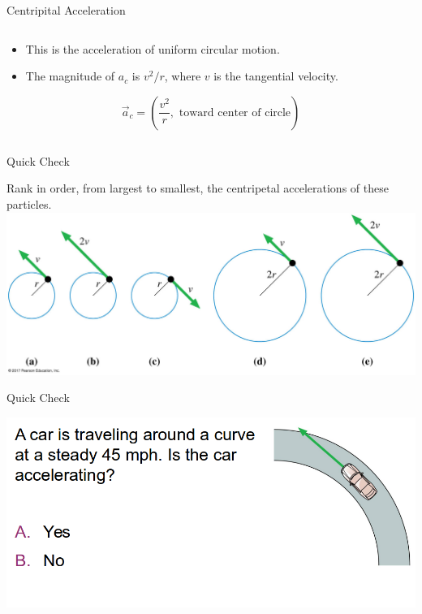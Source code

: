 \documentclass{beamer}
\newcommand{\red}[1]{{\color{red}{#1}}}
\newcommand{\checkh}[2]{\begin{textblock*}{1cm}(#1,#2){\huge \red{\Checkmark}}\end{textblock*}}
\begin{document}
\begin{frame}{Centripital Acceleration}
\begin{columns}
\begin{column}{0.6\textwidth}
\begin{itemize}
   \item This is the acceleration of uniform circular motion.
   \item The magnitude of $a_c$ is $v^2/r$, where $v$ is the tangential velocity.
\end{itemize}
\begin{shaded}
\begin{equation*}
   \vec{a}_c = \left(\frac{v^2}{r}, \text{ toward center of circle}\right)
\end{equation*}
\end{shaded}
\end{column}
\end{columns}
\end{frame}

\begin{frame}{Quick Check}
\begin{center}
   Rank in order, from largest to smallest, the centripetal accelerations of these particles.
   \includegraphics[width=\textwidth]{../figures/Figure_STT4_6.jpg}
\end{center}
\end{frame}

\begin{frame}{Quick Check}
\begin{center}
   \includegraphics[width=\textwidth]{../figures/QC4_9.png}
\end{center}
\only<2>{\checkh{0.7cm}{4.7cm}}
\end{frame}
\end{document}
